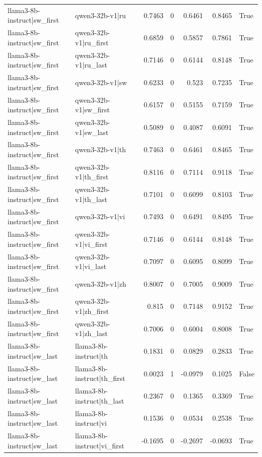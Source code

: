 \begin{table}
\begin{tabular}{l l r r r r l}
llama3-8b-instruct|sw_first & qwen3-32b-v1|ru & 0.7463 & 0 & 0.6461 & 0.8465 & True \\
llama3-8b-instruct|sw_first & qwen3-32b-v1|ru_first & 0.6859 & 0 & 0.5857 & 0.7861 & True \\
llama3-8b-instruct|sw_first & qwen3-32b-v1|ru_last & 0.7146 & 0 & 0.6144 & 0.8148 & True \\
llama3-8b-instruct|sw_first & qwen3-32b-v1|sw & 0.6233 & 0 & 0.523 & 0.7235 & True \\
llama3-8b-instruct|sw_first & qwen3-32b-v1|sw_first & 0.6157 & 0 & 0.5155 & 0.7159 & True \\
llama3-8b-instruct|sw_first & qwen3-32b-v1|sw_last & 0.5089 & 0 & 0.4087 & 0.6091 & True \\
llama3-8b-instruct|sw_first & qwen3-32b-v1|th & 0.7463 & 0 & 0.6461 & 0.8465 & True \\
llama3-8b-instruct|sw_first & qwen3-32b-v1|th_first & 0.8116 & 0 & 0.7114 & 0.9118 & True \\
llama3-8b-instruct|sw_first & qwen3-32b-v1|th_last & 0.7101 & 0 & 0.6099 & 0.8103 & True \\
llama3-8b-instruct|sw_first & qwen3-32b-v1|vi & 0.7493 & 0 & 0.6491 & 0.8495 & True \\
llama3-8b-instruct|sw_first & qwen3-32b-v1|vi_first & 0.7146 & 0 & 0.6144 & 0.8148 & True \\
llama3-8b-instruct|sw_first & qwen3-32b-v1|vi_last & 0.7097 & 0 & 0.6095 & 0.8099 & True \\
llama3-8b-instruct|sw_first & qwen3-32b-v1|zh & 0.8007 & 0 & 0.7005 & 0.9009 & True \\
llama3-8b-instruct|sw_first & qwen3-32b-v1|zh_first & 0.815 & 0 & 0.7148 & 0.9152 & True \\
llama3-8b-instruct|sw_first & qwen3-32b-v1|zh_last & 0.7006 & 0 & 0.6004 & 0.8008 & True \\
llama3-8b-instruct|sw_last & llama3-8b-instruct|th & 0.1831 & 0 & 0.0829 & 0.2833 & True \\
llama3-8b-instruct|sw_last & llama3-8b-instruct|th_first & 0.0023 & 1 & -0.0979 & 0.1025 & False \\
llama3-8b-instruct|sw_last & llama3-8b-instruct|th_last & 0.2367 & 0 & 0.1365 & 0.3369 & True \\
llama3-8b-instruct|sw_last & llama3-8b-instruct|vi & 0.1536 & 0 & 0.0534 & 0.2538 & True \\
llama3-8b-instruct|sw_last & llama3-8b-instruct|vi_first & -0.1695 & 0 & -0.2697 & -0.0693 & True \\

\end{tabular}
\end{table}
